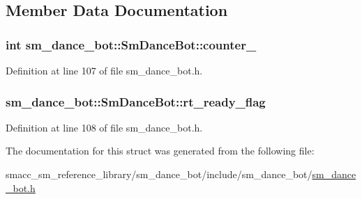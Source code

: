 \subsection{Member Data Documentation}
\subsubsection[{\texorpdfstring{counter\+\_\+1}{counter_1}}]{\setlength{\rightskip}{0pt plus 5cm}int sm\+\_\+dance\+\_\+bot\+::\+Sm\+Dance\+Bot\+::counter\+\_}\hypertarget{structsm__dance__bot_1_1SmDanceBot_ab3b8db557ce94d34c60b291911eb140c}{}\label{structsm__dance__bot_1_1SmDanceBot_ab3b8db557ce94d34c60b291911eb140c}


Definition at line 107 of file sm\+\_\+dance\+\_\+bot.\+h.

\subsubsection[{\texorpdfstring{rt\+\_\+ready\+\_\+flag}{rt_ready_flag}}]{ sm\+\_\+dance\+\_\+bot\+::\+Sm\+Dance\+Bot\+::rt\+\_\+ready\+\_\+flag}\hypertarget{structsm__dance__bot_1_1SmDanceBot_a0f0587a13670ad8925555cd8f6cb6b2d}{}\label{structsm__dance__bot_1_1SmDanceBot_a0f0587a13670ad8925555cd8f6cb6b2d}


Definition at line 108 of file sm\+\_\+dance\+\_\+bot.\+h.



The documentation for this struct was generated from the following file\+:\begin{DoxyCompactItemize}
\item 
smacc\+\_\+sm\+\_\+reference\+\_\+library/sm\+\_\+dance\+\_\+bot/include/sm\+\_\+dance\+\_\+bot/\hyperlink{sm__dance__bot_8h}{sm\+\_\+dance\+\_\+bot.\+h}\end{DoxyCompactItemize}

